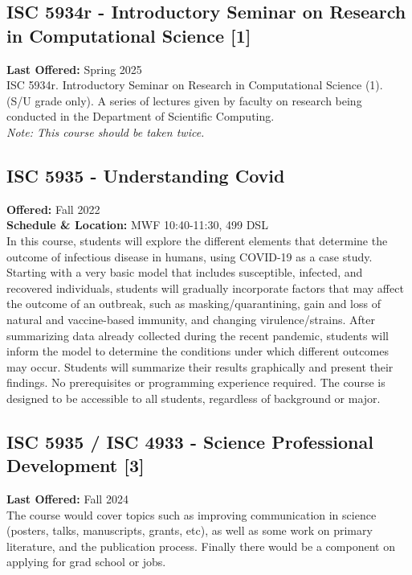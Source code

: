 \documentclass[12pt,a4paper]{article}
\begin{document}
\subsection{ISC 5934r - Introductory Seminar on Research in Computational Science [1]}
\textbf{Last Offered:} Spring 2025 \\
ISC 5934r. Introductory Seminar on Research in Computational Science (1). (S/U grade only). A series of lectures given by faculty on research being conducted in the Department of Scientific Computing. \\
\textit{Note: This course should be taken twice.}

\subsection{ISC 5935 - Understanding Covid}
\textbf{Offered:} Fall 2022 \\
\textbf{Schedule \& Location:} MWF 10:40-11:30, 499 DSL \\
In this course, students will explore the different elements that determine the outcome of infectious disease in humans, using COVID-19 as a case study. Starting with a very basic model that includes susceptible, infected, and recovered individuals, students will gradually incorporate factors that may affect the outcome of an outbreak, such as masking/quarantining, gain and loss of natural and vaccine-based immunity, and changing virulence/strains. After summarizing data already collected during the recent pandemic, students will inform the model to determine the conditions under which different outcomes may occur. Students will summarize their results graphically and present their findings. No prerequisites or programming experience required. The course is designed to be accessible to all students, regardless of background or major.

\subsection{ISC 5935 / ISC 4933 - Science Professional Development [3]}
\textbf{Last Offered:} Fall 2024 \\
The course would cover topics such as improving communication in science (posters, talks, manuscripts, grants, etc), as well as some work on primary literature, and the publication process. Finally there would be a component on applying for grad school or jobs.
\end{document}
